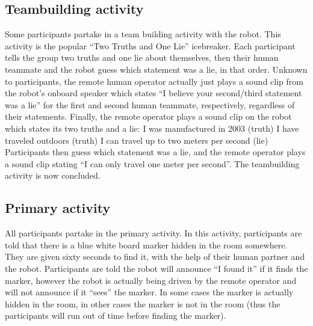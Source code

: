\documentclass{acm_proc_article-sp}
\begin{document}
\subsection{Teambuilding activity}
Some participants partake in a team building activity with the robot. This activity is the popular ``Two Truths and One Lie'' icebreaker. Each participant tells the group two truths and one lie about themselves, then their human teammate and the robot guess which statement was a lie, in that order. Unknown to participants, the remote human operator actually just plays a sound clip from the robot's onboard speaker which states ``I believe your second/third statement was a lie'' for the first and second human teammate, respectively, regardless of their statements. Finally, the remote operator plays a sound clip on the robot which states its two truths and a lie:
I was manufactured in 2003 (truth)
I have traveled outdoors (truth)
I can travel up to two meters per second (lie)
Participants then guess which statement was a lie, and the remote operator plays a sound clip stating ``I can only travel one meter per second''. The teambuilding activity is now concluded.
\subsection{Primary activity}
All participants partake in the primary activity. In this activity, participants are told that there is a blue white board marker hidden in the room somewhere. They are given sixty seconds to find it, with the help of their human partner and the robot. Participants are told the robot will announce ``I found it'' if it finds the marker, however the robot is actually being driven by the remote operator and will not announce if it ``sees'' the marker. In some cases the marker is actually hidden in the room, in other cases the marker is not in the room (thus the participants will run out of time before finding the marker). 
\end{document}
